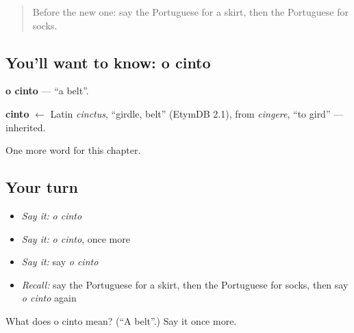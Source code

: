 \begin{quote}
Before the new one: say the Portuguese for a skirt, then the Portuguese for socks.
\end{quote}

\subsection*{You'll want to know: o cinto}
\textbf{o cinto} — \textquotedblleft{}a belt\textquotedblright{}.

\begin{cousinweb}
\textbf{cinto} $\leftarrow$ Latin \emph{cinctus}, \textquotedblleft{}girdle, belt\textquotedblright{} (EtymDB 2.1), from \emph{cingere}, \textquotedblleft{}to gird\textquotedblright{} — inherited.
\end{cousinweb}

\begin{grammarlens}[title={What you've built}]
One more word for this chapter.
\end{grammarlens}

\subsection*{Your turn}
\begin{itemize}
\raggedright
  \item \emph{Say it:} \emph{o cinto}
  \item \emph{Say it:} \emph{o cinto}, once more
  \item \emph{Say it:} say \emph{o cinto}
  \item \emph{Recall:} say the Portuguese for a skirt, then the Portuguese for socks, then say \emph{o cinto} again
\end{itemize}

\begin{tcolorbox}[breakable,colback=teal!4,colframe=teal!35!black,title={Before you move on}]
What does o cinto mean? (\textquotedblleft{}A belt\textquotedblright{}.) Say it once more.
\end{tcolorbox}
